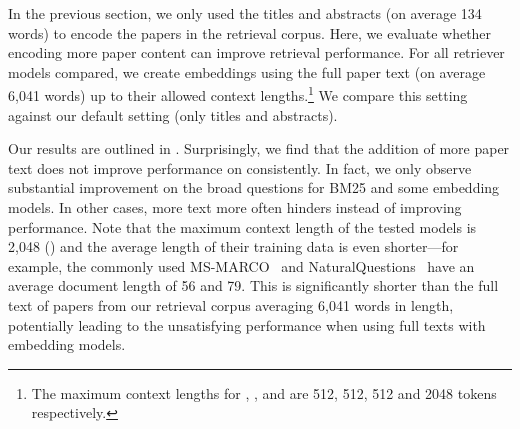 In the previous section, we only used the titles and abstracts (on average 134 words) to encode the papers in the retrieval corpus. Here, we evaluate whether encoding more paper content can improve retrieval performance. For all retriever models compared, we create embeddings using the full paper text (on average 6,041 words) up to their allowed context lengths.\footnote{The maximum context lengths for  \gtrfull{}, \instructorfull{}, \efivefull{} and \gritfull{} are 512, 512, 512 and 2048 tokens respectively.} We compare this setting against our default setting (only titles and abstracts).

Our results are outlined  in . Surprisingly, we find that the addition of more paper text does not improve performance on \ours{} consistently. In fact, we only observe substantial improvement on the \authorq{} broad questions for BM25 and some embedding models. In other cases, more text more often hinders instead of improving performance. 
Note that the maximum context length of the tested models is 2,048 (\grit{}) and the average length of their training data is even shorter---for example, the commonly used MS-MARCO~\citep{nguyen2017ms} and NaturalQuestions~\citep{lee-etal-2019-latent} have an average document length of 56 and 79. This is  significantly shorter than the full text of papers from our retrieval corpus averaging 6,041 words in length, potentially leading to the
unsatisfying performance when using full texts with embedding models.

